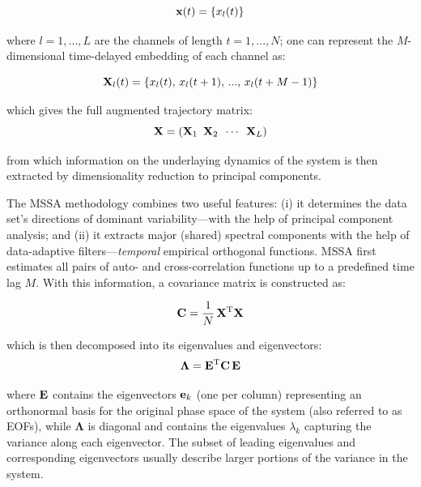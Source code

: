 \begin{equation}
  \mathbf{x}(t) = \{x_l(t)\}
\end{equation}
  
\noindent
where $l = 1,...,L$ are the channels of length $t = 1,...,N$; one can represent the $M$-dimensional time-delayed embedding of each channel as:

\begin{equation}
  \mathbf{X}_l(t) = \{x_l(t), \, x_l(t+1), \, ..., \, x_l(t+M-1)\}
\end{equation}

\noindent
which gives the full augmented trajectory matrix:
\begin{equation}
  \mathbf{X} = \left( \mathbf{X}_1 \,\,\, \mathbf{X}_2 \,\,\, \cdots \,\,\, \mathbf{X}_L \right)
\end{equation}

\noindent
from which information on the underlaying dynamics of the system is then extracted by dimensionality reduction to principal components. 

The MSSA methodology combines two useful features: (i) it determines
the data set's directions of dominant variability---with the help of principal component analysis; and (ii) it extracts major (shared) spectral components with the help of data-adaptive filters---{\it temporal} empirical orthogonal functions.
MSSA first estimates all pairs of auto- and cross-correlation functions up
to a predefined time lag $M$. With this information, a covariance matrix is constructed as:

\begin{equation}
  \mathbf{C} = \frac{1}{N} \, \mathbf{X}^\text{T} \mathbf{X}
\end{equation}

\noindent
which is then decomposed into its eigenvalues and eigenvectors:
\begin{equation}
  \boldsymbol\Lambda = \mathbf{E}^\text{T} \mathbf{C} \, \mathbf{E}
  \label{eigendecomposition}
\end{equation}

\noindent
where $\mathbf{E}$ contains the eigenvectors $\mathbf{e}_k$ (one per column) representing an orthonormal basis for the original phase space of the system (also referred to as EOFs), while $\boldsymbol\Lambda$ is diagonal and contains the eigenvalues $\lambda_k$ capturing the variance along each eigenvector. The subset of leading eigenvalues and corresponding eigenvectors usually describe larger portions of the variance in the system.

